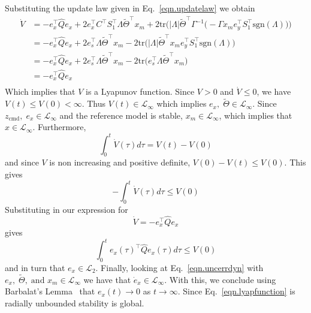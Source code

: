 \documentclass[]{../sty/JGCD}
\theoremstyle{examplestyle}
\begin{document}
\begin{proof-dan}
\begin{equation*}
    \end{equation*}
    Substituting the update law given in Eq.\ \eqref{eqn.updatelaw} we obtain
    \begin{equation*}
      \begin{split}
        \dot{V}
        &=
        -e_{x}^{\top}\widehat{Q}e_{x}+2e_{x}^{\top}C^{\top}S_{1}^{\top}\Lambda\widetilde{\Theta}^{\top}x_{m}+2\text{tr}\bigr(|\Lambda|\widetilde{\Theta}^{\top}\Gamma^{-1}\bigr(-\Gamma x_{m}e_{y}^{\top}S_{1}^{\top}\text{sgn}(\Lambda)\bigr)\bigr) \\
        &=
        -e_{x}^{\top}\widehat{Q}e_{x}+2e_{s}^{\top}\Lambda\widetilde{\Theta}^{\top}x_{m}-2\text{tr}\bigr(|\Lambda|\widetilde{\Theta}^{\top}x_{m}e_{y}^{\top}S_{1}^{\top}\text{sgn}(\Lambda)\bigr) \\
        &=
        -e_{x}^{\top}\widehat{Q}e_{x}+2e_{s}^{\top}\Lambda\widetilde{\Theta}^{\top}x_{m}-2\text{tr}\bigr(e_{s}^{\top}\Lambda\widetilde{\Theta}^{\top}x_{m}\bigr) \\
        &=
        -e_{x}^{\top}\widehat{Q}e_{x} \\
      \end{split}
    \end{equation*}
    Which implies that $V$ is a Lyapunov function. Since $V>0$ and $\dot{V}\leq0$, we have $V(t)\leq V(0)<\infty$. Thus $V(t)\in\mathcal{L}_{\infty}$ which implies $e_{x}, \; \widetilde{\Theta}\in\mathcal{L}_{\infty}$. Since $z_{\text{cmd}},\;e_{x}\in\mathcal{L}_{\infty}$ and the reference model is stable, $x_{m}\in\mathcal{L}_{\infty}$, which implies that $x\in\mathcal{L}_{\infty}$. Furthermore,
    \begin{equation*}
      \int_{0}^{t}\dot{V}(\tau)d\tau=V(t)-V(0)
    \end{equation*}
    and since $V$ is non increasing and positive definite, $V(0)-V(t)\leq V(0)$. This gives
    \begin{equation*}
      -\int_{0}^{t}\dot{V}(\tau)d\tau\leq V(0)
    \end{equation*}
    Substituting in our expression for
    \begin{equation*}
      \dot{V}=-e_{x}^{\top}\widehat{Q}e_{x}
    \end{equation*}
    gives
    \begin{equation*}
      \int_{0}^{t}e_{x}(\tau)^{\top}\widehat{Q}e_{x}(\tau)d\tau\leq V(0)
    \end{equation*}
    and in turn that $e_{x}\in\mathcal{L}_{2}$.
    Finally, looking at Eq.\ \eqref{eqn.uncerrdyn} with $e_{x}, \; \widetilde{\Theta}, \;\text{and } x_{m}\in\mathcal{L}_{\infty}$ we have that $\dot{e}_{x}\in\mathcal{L}_{\infty}$.
    With this, we conclude using Barbalat's Lemma\ \cite{narendra.stable.2005} that $e_{x}(t)\rightarrow0$ as $t\rightarrow\infty$.
    Since Eq.\ \eqref{eqn.lyapfunction} is radially unbounded stability is global.
  \end{proof-dan}
\end{document}
